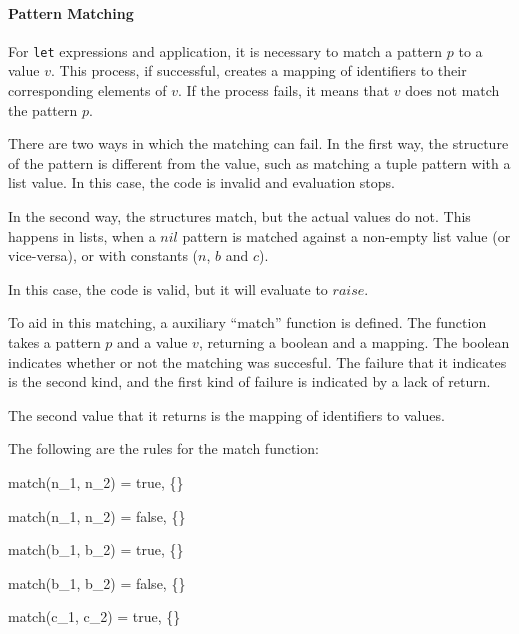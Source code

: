 \documentclass{article}
\begin{document}
\paragraph{Pattern Matching}

For \texttt{let} expressions and application, it is necessary to match a pattern $p$ to a value $v$.
This process, if successful, creates a mapping of identifiers to their corresponding elements of $v$.
If the process fails, it means that $v$ does not match the pattern $p$.

There are two ways in which the matching can fail.
In the first way, the structure of the pattern is different from the value, such as matching a tuple pattern with a list value.
In this case, the code is invalid and evaluation stops.

In the second way, the structures match, but the actual values do not.
This happens in lists, when a $nil$ pattern is matched against a non-empty list value (or vice-versa), or with constants ($n$, $b$ and $c$).

In this case, the code is valid, but it will evaluate to $raise$.

\medskip

To aid in this matching, a auxiliary ``match'' function is defined.
The function takes a pattern $p$ and a value $v$, returning a boolean and a mapping.
The boolean indicates whether or not the matching was succesful.
The failure that it indicates is the second kind, and the first kind of failure is indicated by a lack of return.

The second value that it returns is the mapping of identifiers to values.

The following are the rules for the match function:



    {match(n_1, n_2) = true, \{\}}

    {match(n_1, n_2) = false, \{\}}

    {match(b_1, b_2) = true, \{\}}

    {match(b_1, b_2) = false, \{\}}

    {match(c_1, c_2) = true, \{\}}
\end{document}
